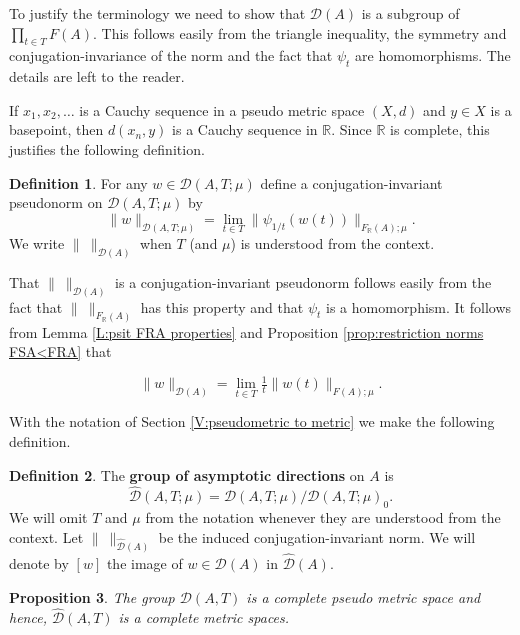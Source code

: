\documentclass[12pt]{amsart}
\newtheorem{prop}{Proposition}[section]
\theoremstyle{definition}
\newtheorem{defn}[prop]{Definition}
\def\RR{\ensuremath{\mathbb{R}}}
\newcommand{\C}[1]{\mathcal{#1}}
\def\Free{F}
\def\D{\mathcal{D}}
\def\tD{\hat{\D}}
\begin{document}
To justify the terminology we need to show that $\C D(A)$ is a subgroup of $\prod_{t \in T} \Free(A)$.
This follows easily from the triangle inequality, the symmetry and conjugation-invariance of the norm and the fact that $\psi_t$ are homomorphisms.
The details are left to the reader.

If $x_1,x_2,\dots$ is a Cauchy sequence in a pseudo metric space $(X,d)$ and $y \in X$ is a basepoint, then $d(x_n,y)$ is a Cauchy sequence in $\RR$.
Since $\RR$ is complete, this justifies the following definition.


\begin{defn}\label{D:norm on D(A) 2}
For any $w \in \C D(A,T;\mu)$ define a conjugation-invariant pseudonorm on $\C D(A,T;\mu)$ by
\[
\| w \|_{\C D(A,T;\mu)} = \lim_{t \in T} \| \psi_{1/t}(w(t))\|_{\Free_\RR(A);\mu}.
\]
We write $\| \ \|_{\C D(A)}$ when $T$ (and $\mu$) is understood from the context.
\end{defn}

That $\| \ \|_{\C D(A)}$ is a conjugation-invariant pseudonorm follows easily from the fact that $\| \ \|_{\Free_\RR(A)}$ has this property and that $\psi_{t}$ is a homomorphism.
It follows from Lemma \ref{L:psit FRA properties} and Proposition \ref{prop:restriction norms FSA<FRA} that

\begin{equation}\label{E:borm on D(A) via F(A)}
\| w \|_{\C D(A)} = \lim_{t \in T} \tfrac{1}{t} \| w(t)\|_{\Free(A);\mu}.
\end{equation}





With the notation of Section \ref{V:pseudometric to metric} we make the following definition.

\begin{defn}
The {\bf group of asymptotic directions} on $A$ is
\[
\tD(A,T;\mu) = \C D(A,T;\mu) / \C D(A,T;\mu)_0.
\]
We will omit $T$ and $\mu$ from the notation whenever they are understood from the context.
Let $\| \ \|_{\tD(A)}$ be the induced conjugation-invariant norm.
We will denote by $[w]$ the image of $w \in \C D(A)$ in $\tD(A)$.
\end{defn}









\begin{prop}\label{P:tD(A) is complete}
The group $\C D(A,T)$ is a complete pseudo metric space and hence, $\tD(A,T)$ is a complete metric spaces.
\end{prop}
\end{document}
